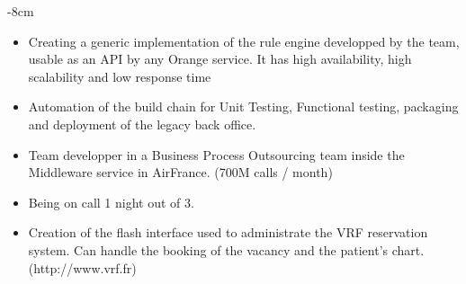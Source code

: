 \documentclass[10pt,a4paper]{altacv}
\begin{document}

\begin{adjustwidth}{}{-8cm}
\makecvheader
\end{adjustwidth}


\begin{itemize}
\item Creating a generic implementation of the rule engine developped by the team, usable as an API by any Orange service. It has high availability, high scalability and low response time
\item Automation of the build chain for Unit Testing, Functional testing, packaging and deployment of the legacy back office.
\end{itemize}

\divider

\begin{itemize}
\item Team developper in a Business Process Outsourcing team inside the Middleware service in AirFrance. (700M calls / month)
\item Being on call 1 night out of 3.
\end{itemize}
\divider

\begin{itemize}
\item Creation of the flash interface used to administrate the VRF reservation system. Can handle the booking of the vacancy and the patient's chart. (http://www.vrf.fr) 
\end{itemize}
\divider
\end{document}
